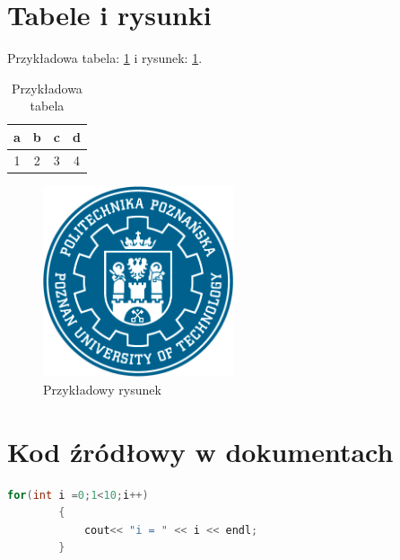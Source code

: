 \documentclass[10pt,a4paper]{article}
\begin{document}
	\section{Tabele i rysunki}
	
	Przykładowa tabela: \ref{tab} i rysunek: \ref{rys}.
	
	\begin{table}[h!]
		\centering
		\caption{Przykładowa tabela}
		\label{tab}
		\begin{tabular}{c|c|c|c}
			a & b & c & d \\ \hline
			1 & 2 & 3 & 4
		\end{tabular}
	\end{table}

	\begin{figure}[h!]
		\centering
		\includegraphics[width=0.5\textwidth]{Rys/pp-putlogopelne.png}
		\caption{Przykładowy rysunek}
		\label{rys}
	\end{figure}

\section{Kod źródłowy w dokumentach}

	\begin{lstlisting}[language=C++]
		for(int i =0;1<10;i++)
		{ 
			cout<< "i = " << i << endl;
		}
	\end{lstlisting}
	
	
\end{document}
